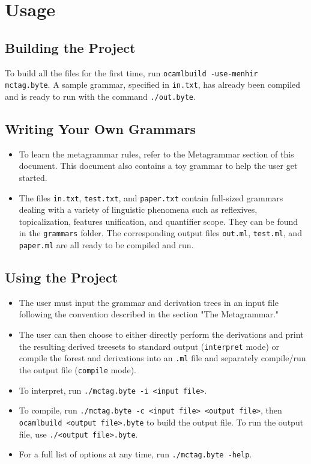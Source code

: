 \documentclass[10.5pt]{article}
\newcommand{\code}[1]{\texttt{#1}}
\begin{document}
\section{Usage}

\subsection{Building the Project}
To build all the files for the first time, run \code{ocamlbuild -use-menhir mctag.byte}. A sample grammar, specified in \code{in.txt}, has already been compiled and is ready to run with the command \code{./out.byte}.

\subsection{Writing Your Own Grammars}
  \begin{itemize}
    \item To learn the metagrammar rules, refer to the Metagrammar section of this document. This document also contains a toy grammar to help the user get started.
	\item The files \code{in.txt}, \code{test.txt}, and \code{paper.txt} contain full-sized grammars dealing with a variety of linguistic phenomena such as reflexives, topicalization, features unification, and quantifier scope. They can be found in the \code{grammars} folder. The corresponding output files \code{out.ml}, \code{test.ml}, and \code{paper.ml} are all ready to be compiled and run.
  \end{itemize}

\subsection{Using the Project}
  \begin{itemize}
    \item The user must input the grammar and derivation trees in an input file following the convention described in the section "The Metagrammar."
	\item The user can then choose to either directly perform the derivations and print the resulting derived treesets to standard output (\code{interpret} mode) or compile the forest and derivations into an \code{.ml} file and separately compile/run the output file (\code{compile} mode).
	\item To interpret, run \code{./mctag.byte -i <input file>}.
	\item To compile, run \code{./mctag.byte -c <input file> <output file>}, then \code{ocamlbuild <output file>.byte} to build the output file. To run the output file, use \code{./<output file>.byte}.
	\item For a full list of options at any time, run \code{./mctag.byte -help}.
  \end{itemize}
\end{document}

